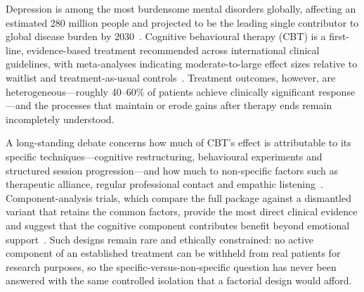 \documentclass[sn-nature,pdflatex]{sn-jnl}
\begin{document}
\maketitle


Depression is among the most burdensome mental disorders globally, affecting an estimated 280 million people and projected to be the leading single contributor to global disease burden by 2030~\cite{who2022}. Cognitive behavioural therapy (CBT) is a first-line, evidence-based treatment recommended across international clinical guidelines, with meta-analyses indicating moderate-to-large effect sizes relative to waitlist and treatment-as-usual controls~\cite{cuijpers2013,hofmann2012}. Treatment outcomes, however, are heterogeneous---roughly 40--60\% of patients achieve clinically significant response---and the processes that maintain or erode gains after therapy ends remain incompletely understood.

A long-standing debate concerns how much of CBT's effect is attributable to its specific techniques---cognitive restructuring, behavioural experiments and structured session progression---and how much to non-specific factors such as therapeutic alliance, regular professional contact and empathic listening~\cite{lambert1992}. Component-analysis trials, which compare the full package against a dismantled variant that retains the common factors, provide the most direct clinical evidence and suggest that the cognitive component contributes benefit beyond emotional support~\cite{jacobson1996}. Such designs remain rare and ethically constrained: no active component of an established treatment can be withheld from real patients for research purposes, so the specific-versus-non-specific question has never been answered with the same controlled isolation that a factorial design would afford.
\end{document}
